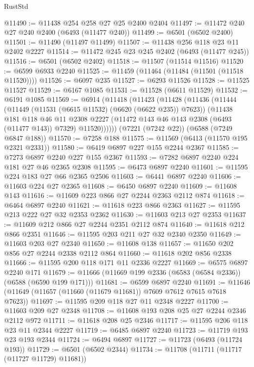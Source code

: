 \begin{lexlean}{RustStd}
\begin{coremodule}
@11490 := @11438 @254 @258 @27 @25 @2400 @2404
@11497 := @11472 @240 @27 @240 @2400 (@6493 (@11477 @240))
@11499 := @6501 (@6502 @2400)
@11501 := @11490 (@11497 @11499)
@11507 := @11438 @256 @118 @23 @11 @2402 @2227
@11514 := @11472 @245 @23 @245 @2402 (@6493 (@11477 @245))
@11516 := @6501 (@6502 @2402)
@11518 := @11507 (@11514 @11516)
@11520 := @6599 @6933 @2240
@11525 := @11459 (@11464 (@11484 (@11501 (@11518 @11520))))
@11526 := @6097 @235
@11527 := @6293 @11526
@11528 := @11525 @11527
@11529 := @6167 @1085
@11531 := @11528 (@6611 @11529)
@11532 := @6191 @1085
@11569 := @6914
    (@11418
      (@11423
        (@11428
          (@11436
            (@11444
              (@11449 (@11531 (@6615 @11532) (@6620 (@6622 @235)) @7623))
              (@11438
                @181
                @118
                @46
                @11
                @2308
                @2227
                (@11472 @143 @46 @143 @2308 (@6493 (@11477 @143)) @7329)
                @11520))))))
    (@7221 (@7242 @22))
    (@6588 (@7249 @6847 @188))
@11570 := @7258 @188
@11575 := @11569 (@6413 (@11570 @195 @2321 @2331))
@11580 := @6419 @6897 @227 @155 @2244 @2367
@11585 := @7273 @6897 @2240 @227 @155 @2367
@11593 := @7282 @6897 @2240 @224 @181 @27 @46 @2365 @2308
@11595 := @6473 @6897 @2240
@11601 := @11595 @224 @183 @27 @66 @2365 @2506
@11603 := @6441 @6897 @2240
@11606 := @11603 @224 @27 @2365
@11608 := @6450 @6897 @2240
@11609 := @11608 @143
@11616 := @11609 @223 @866 @27 @2244 @2363 @2112 @874
@11618 := @6464 @6897 @2240
@11621 := @11618 @223 @866 @2363
@11627 := @11595 @213 @222 @27 @32 @2353 @2362
@11630 := @11603 @213 @27 @2353
@11637 := @11609 @212 @866 @27 @2244 @2351 @2112 @874
@11640 := @11618 @212 @866 @2351
@11646 := @11595 @203 @211 @27 @32 @2340 @2350
@11649 := @11603 @203 @27 @2340
@11650 := @11608 @138
@11657 := @11650 @202 @856 @27 @2244 @2338 @2112 @864
@11660 := @11618 @202 @856 @2338
@11666 := @11595 @200 @118 @171 @11 @2336 @2227
@11669 := @6575 @6897 @2240 @171
@11679 := @11666 (@11669 @199 @2336 (@6583 (@6584 @2336)) (@6588 (@6590 @199 @171)))
@11681 := @6599 @6897 @2240
@11691 := @11646 (@11649 (@11657 (@11660 (@11679 @11681)) @7609 @7612 @7615 @7618 @7623))
@11697 := @11595 @209 @118 @27 @11 @2348 @2227
@11700 := @11603 @209 @27 @2348
@11708 := @11608 @193 @208 @25 @27 @2244 @2346 @2112 @972
@11711 := @11618 @208 @25 @2346
@11717 := @11595 @206 @118 @23 @11 @2344 @2227
@11719 := @6485 @6897 @2240
@11723 := @11719 @193 @23 @193 @2344
@11724 := @6494 @6897
@11727 := @11723 (@6493 (@11724 @193))
@11729 := @6501 (@6502 @2344)
@11734 := @11708 (@11711 (@11717 (@11727 @11729) @11681))

\end{coremodule}
\end{lexlean}
